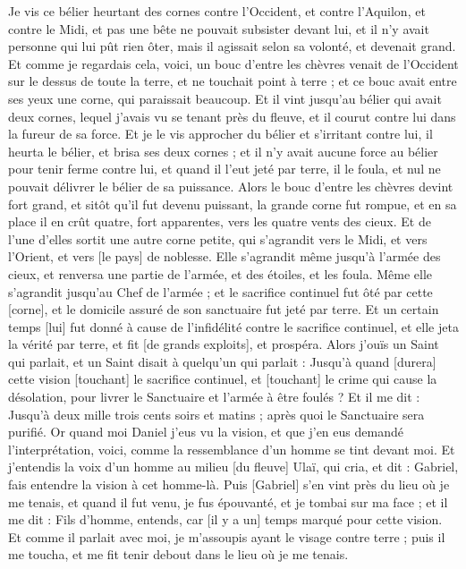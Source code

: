\begin{multicols}{2}
Je vis ce bélier heurtant des cornes contre l'Occident, et contre l'Aquilon, et contre le Midi, et pas une bête ne pouvait subsister devant lui, et il n'y avait personne qui lui pût rien ôter, mais il agissait selon sa volonté, et devenait grand.
Et comme je regardais cela, voici, un bouc d'entre les chèvres venait de l'Occident sur le dessus de toute la terre, et ne touchait point à terre ; et ce bouc avait entre ses yeux une corne, qui paraissait beaucoup.
Et il vint jusqu'au bélier qui avait deux cornes, lequel j'avais vu se tenant près du fleuve, et il courut contre lui dans la fureur de sa force.
Et je le vis approcher du bélier et s'irritant contre lui, il heurta le bélier, et brisa ses deux cornes ; et il n'y avait aucune force au bélier pour tenir ferme contre lui, et quand il l'eut jeté par terre, il le foula, et nul ne pouvait délivrer le bélier de sa puissance.
Alors le bouc d'entre les chèvres devint fort grand, et sitôt qu'il fut devenu puissant, la grande corne fut rompue, et en sa place il en crût quatre, fort apparentes, vers les quatre vents des cieux.
Et de l'une d'elles sortit une autre corne petite, qui s'agrandit vers le Midi, et vers l'Orient, et vers [le pays] de noblesse.
Elle s'agrandit même jusqu'à l'armée des cieux, et renversa une partie de l'armée, et des étoiles, et les foula.
Même elle s'agrandit jusqu'au Chef de l'armée ; et le sacrifice continuel fut ôté par cette [corne], et le domicile assuré de son sanctuaire fut jeté par terre.
Et un certain temps [lui] fut donné à cause de l'infidélité contre le sacrifice continuel, et elle jeta la vérité par terre, et fit [de grands exploits], et prospéra.
Alors j'ouïs un Saint qui parlait, et un Saint disait à quelqu'un qui parlait : Jusqu'à quand [durera] cette vision [touchant] le sacrifice continuel, et [touchant] le crime qui cause la désolation, pour livrer le Sanctuaire et l'armée à être foulés ?
Et il me dit : Jusqu'à deux mille trois cents soirs et matins ; après quoi le Sanctuaire sera purifié.
Or quand moi Daniel j'eus vu la vision, et que j'en eus demandé l'interprétation, voici, comme la ressemblance d'un homme se tint devant moi.
Et j'entendis la voix d'un homme au milieu [du fleuve] Ulaï, qui cria, et dit : Gabriel, fais entendre la vision à cet homme-là.
Puis [Gabriel] s'en vint près du lieu où je me tenais, et quand il fut venu, je fus épouvanté, et je tombai sur ma face ; et il me dit : Fils d'homme, entends, car [il y a un] temps marqué pour cette vision.
Et comme il parlait avec moi, je m'assoupis ayant le visage contre terre ; puis il me toucha, et me fit tenir debout dans le lieu où je me tenais.

\end{multicols}
